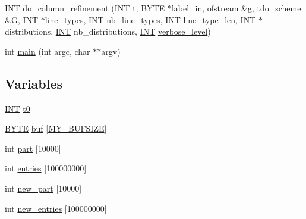 \begin{DoxyCompactItemize}
\item 
\mbox{\hyperlink{galois_8h_a09fddde158a3a20bd2dcadb609de11dc}{I\+NT}} \mbox{\hyperlink{tdo__refine__all_8_c_aad499b1b3eae7f9bc967c96eec7abce8}{do\+\_\+column\+\_\+refinement}} (\mbox{\hyperlink{galois_8h_a09fddde158a3a20bd2dcadb609de11dc}{I\+NT}} \mbox{\hyperlink{alphabet2_8_c_ac310d9181e916ba43604099aee272c71}{t}}, \mbox{\hyperlink{galois_8h_ab6cc7b4aeb6ea31aba2b3fbfc83ff5e6}{B\+Y\+TE}} $\ast$label\+\_\+in, ofstream \&g, \mbox{\hyperlink{classtdo__scheme}{tdo\+\_\+scheme}} \&G, \mbox{\hyperlink{galois_8h_a09fddde158a3a20bd2dcadb609de11dc}{I\+NT}} $\ast$line\+\_\+types, \mbox{\hyperlink{galois_8h_a09fddde158a3a20bd2dcadb609de11dc}{I\+NT}} nb\+\_\+line\+\_\+types, \mbox{\hyperlink{galois_8h_a09fddde158a3a20bd2dcadb609de11dc}{I\+NT}} line\+\_\+type\+\_\+len, \mbox{\hyperlink{galois_8h_a09fddde158a3a20bd2dcadb609de11dc}{I\+NT}} $\ast$distributions, \mbox{\hyperlink{galois_8h_a09fddde158a3a20bd2dcadb609de11dc}{I\+NT}} nb\+\_\+distributions, \mbox{\hyperlink{galois_8h_a09fddde158a3a20bd2dcadb609de11dc}{I\+NT}} \mbox{\hyperlink{simeon_8_c_a818073fbcc2f439e7c56952f67386122}{verbose\+\_\+level}})
\item 
int \mbox{\hyperlink{tdo__refine__all_8_c_a3c04138a5bfe5d72780bb7e82a18e627}{main}} (int argc, char $\ast$$\ast$argv)
\end{DoxyCompactItemize}
\subsection*{Variables}
\begin{DoxyCompactItemize}
\item 
\mbox{\hyperlink{galois_8h_a09fddde158a3a20bd2dcadb609de11dc}{I\+NT}} \mbox{\hyperlink{tdo__refine__all_8_c_a4268f4fe222ffb119218a0199f5e1904}{t0}}
\item 
\mbox{\hyperlink{galois_8h_ab6cc7b4aeb6ea31aba2b3fbfc83ff5e6}{B\+Y\+TE}} \mbox{\hyperlink{tdo__refine__all_8_c_a83ec2e07441c5d5b4a826072d2cc793f}{buf}} \mbox{[}\mbox{\hyperlink{isomorph__files_8_c_a6079b3b36c54787d2dca2de2fb2c96df}{M\+Y\+\_\+\+B\+U\+F\+S\+I\+ZE}}\mbox{]}
\item 
int \mbox{\hyperlink{tdo__refine__all_8_c_af32a7ef139fc39ca4f560f3a90a83b89}{part}} \mbox{[}10000\mbox{]}
\item 
int \mbox{\hyperlink{tdo__refine__all_8_c_ad9086a751cffd4ad4acff2d919aa0e9a}{entries}} \mbox{[}100000000\mbox{]}
\item 
int \mbox{\hyperlink{tdo__refine__all_8_c_a389ae8371622b1cd9d3287e9261e7240}{new\+\_\+part}} \mbox{[}10000\mbox{]}
\item 
int \mbox{\hyperlink{tdo__refine__all_8_c_a11661198817241e817fbaf4b027b0d95}{new\+\_\+entries}} \mbox{[}100000000\mbox{]}
\end{DoxyCompactItemize}


